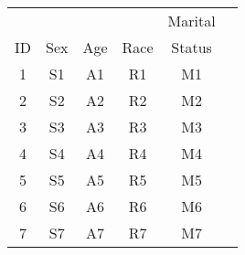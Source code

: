 \begin{tabular}{cccccc}
   &     &     &      & Marital \\
ID & Sex & Age & Race & Status \\
\hline
1  & S1  & A1  & R1   & M1  \\
2  & S2  & A2  & R2 & M2  \\
3  & S3  & A3  & R3 & M3  \\
4  & S4  & A4  & R4 & M4  \\
5  & S5  & A5  & R5 & M5  \\
6  & S6  & A6  & R6 & M6  \\
7  & S7  & A7  & R7 & M7  \\
\hline
\end{tabular}
